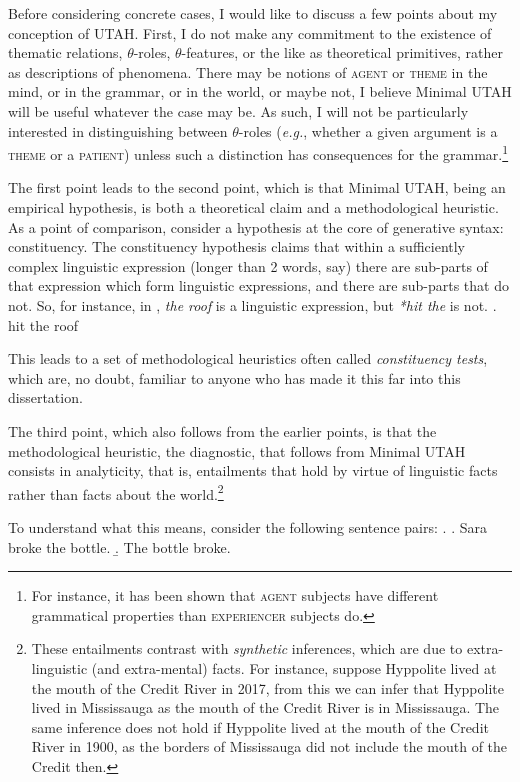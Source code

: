 Before considering concrete cases, I would like to discuss a few points about my conception of UTAH.
First, I do not make any commitment to the existence of thematic relations, $\theta$-roles, $\theta$-features, or the like as theoretical primitives, rather as descriptions of phenomena.
There may be notions of \textsc{agent} or \textsc{theme} in the mind, or in the grammar, or in the world, or maybe not, I believe Minimal UTAH will be useful whatever the case may be.
As such, I will not be particularly interested in distinguishing between $\theta$-roles (\textit{e.g.}, whether a given argument is a \textsc{theme} or a \textsc{patient}) unless such a distinction has consequences for the grammar.\footnote{
	For instance, it has been shown that \textsc{agent} subjects have different grammatical properties than \textsc{experiencer} subjects do.
}

The first point leads to the second point, which is that Minimal UTAH, being an empirical hypothesis, is both a theoretical claim and a methodological heuristic.
As a point of comparison, consider a hypothesis at the core of generative syntax: constituency.
The constituency hypothesis claims that within a sufficiently complex linguistic expression (longer than 2 words, say) there are sub-parts of that expression which form linguistic expressions, and there are sub-parts that do not.
So, for instance, in \Next, \textit{the roof} is a linguistic expression, but \textit{*hit the} is not.
\ex. hit the roof

This leads to a set of methodological heuristics often called \textit{constituency tests}, which are, no doubt, familiar to anyone who has made it this far into this dissertation.

The third point, which also follows from the earlier points, is that the methodological heuristic, the diagnostic, that follows from Minimal UTAH consists in analyticity, that is, entailments that hold by virtue of linguistic facts rather than facts about the world.\footnote{
These entailments contrast with \textit{synthetic} inferences, which are due to extra-linguistic (and extra-mental) facts.
For instance, suppose Hyppolite lived at the mouth of the Credit River in 2017, from this we can infer that Hyppolite lived in Mississauga as the mouth of the Credit River is in Mississauga.
The same inference does not hold if Hyppolite lived at the mouth of the Credit River in 1900, as the borders of Mississauga did not include the mouth of the Credit then.}

To understand what this means, consider the following sentence pairs:
\ex. \label{ex:broke-bottle}
\a. Sara broke the bottle.
\b. The bottle broke.

